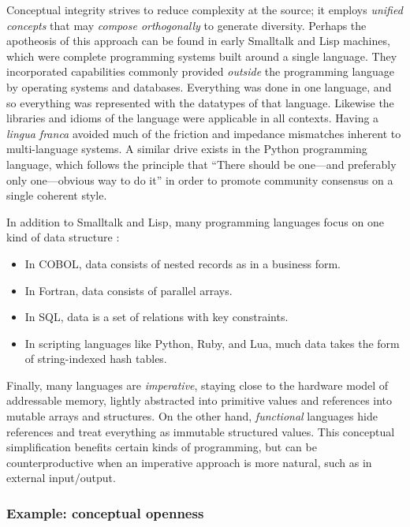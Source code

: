 \documentclass[english,submission]{programming}
\begin{document}
Conceptual integrity strives to reduce complexity at the source; it
employs \emph{unified concepts} that may \emph{compose orthogonally} to
generate diversity. Perhaps the apotheosis of this approach can be found
in early Smalltalk and Lisp machines, which were complete programming
systems built around a single language. They incorporated capabilities
commonly provided \emph{outside} the programming language by operating
systems and databases. Everything was done in one language, and so
everything was represented with the datatypes of that language. Likewise
the libraries and idioms of the language were applicable in all
contexts. Having a \emph{lingua franca} avoided much of the friction and
impedance mismatches inherent to multi-language systems. A similar drive
exists in the Python programming language, which follows the principle
that ``There should be one---and preferably only one---obvious way to do
it'' in order to promote community consensus on a single coherent style.

In addition to Smalltalk and Lisp, many programming languages focus on
one kind of data structure \cite{MemMod}:

\begin{itemize}
\tightlist
\item
  In COBOL, data consists of nested records as in a business form.
\item
  In Fortran, data consists of parallel arrays.
\item
  In SQL, data is a set of relations with key constraints.
\item
  In scripting languages like Python, Ruby, and Lua, much data takes the
  form of string-indexed hash tables.
\end{itemize}

Finally, many languages are \emph{imperative}, staying close to the
hardware model of addressable memory, lightly abstracted into primitive
values and references into mutable arrays and structures. On the other
hand, \emph{functional} languages hide references and treat everything
as immutable structured values. This conceptual simplification benefits
certain kinds of programming, but can be counterproductive when an
imperative approach is more natural, such as in external input/output.

\hypertarget{example-conceptual-openness}{%
\subsubsection{Example: conceptual
openness}\label{example-conceptual-openness}}
\end{document}
